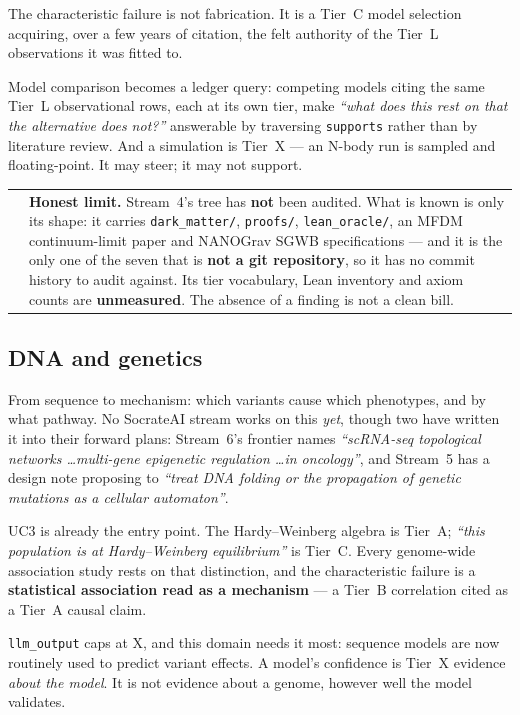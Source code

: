 \documentclass[11pt,a4paper]{article}
\makeatletter
\newcommand{\caveat}[1]{%
  \par\vspace{0.6em}\noindent
  \begin{tabular}{@{}p{0.4em}@{\hspace{0.8em}}p{\dimexpr\linewidth-2.2em\relax}@{}}
  \textcolor{rulegray}{\rule{2pt}{\baselineskip}} & \small #1
  \end{tabular}\par\vspace{0.6em}}
\makeatother
\begin{document}
The characteristic failure is not fabrication. It is a Tier~C model selection acquiring, over a
few years of citation, the felt authority of the Tier~L observations it was fitted to.

Model comparison becomes a ledger query: competing models citing the same Tier~L observational
rows, each at its own tier, make \emph{``what does this rest on that the alternative does
not?''} answerable by traversing \texttt{supports} rather than by literature review. And a
simulation is Tier~X — an N-body run is sampled and floating-point. It may steer; it may not
support.

\caveat{\textbf{Honest limit.} Stream~4's tree has \textbf{not} been audited. What is known is
only its shape: it carries \texttt{dark_matter/}, \texttt{proofs/}, \texttt{lean_oracle/}, an
MFDM continuum-limit paper and NANOGrav SGWB specifications — and it is the only one of the seven
that is \textbf{not a git repository}, so it has no commit history to audit against. Its tier
vocabulary, Lean inventory and axiom counts are \textbf{unmeasured}. The absence of a finding is
not a clean bill.}

\subsection{DNA and genetics}

From sequence to mechanism: which variants cause which phenotypes, and by what pathway. No
SocrateAI stream works on this \emph{yet}, though two have written it into their forward plans:
Stream~6's frontier names \emph{``scRNA-seq topological networks \dots multi-gene epigenetic
regulation \dots in oncology''}, and Stream~5 has a design note proposing to \emph{``treat DNA
folding or the propagation of genetic mutations as a cellular automaton''}.

UC3 is already the entry point. The Hardy–Weinberg algebra is Tier~A; \emph{``this population is
at Hardy–Weinberg equilibrium''} is Tier~C. Every genome-wide association study rests on that
distinction, and the characteristic failure is a \textbf{statistical association read as a
mechanism} — a Tier~B correlation cited as a Tier~A causal claim.

\texttt{llm_output} caps at \textsf{X}, and this domain needs it most: sequence models are now
routinely used to predict variant effects. A model's confidence is Tier~X evidence \emph{about
the model}. It is not evidence about a genome, however well the model validates.
\end{document}
